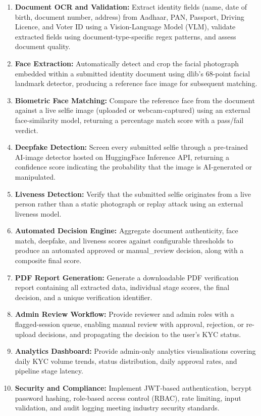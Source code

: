 \documentclass[12pt,a4paper]{report}
\begin{document}
\begin{enumerate}
    \item \textbf{Document OCR and Validation:} Extract identity fields (name, date of birth, document number, address) from Aadhaar, PAN, Passport, Driving Licence, and Voter ID using a Vision-Language Model (VLM), validate extracted fields using document-type-specific regex patterns, and assess document quality.

    \item \textbf{Face Extraction:} Automatically detect and crop the facial photograph embedded within a submitted identity document using dlib's 68-point facial landmark detector, producing a reference face image for subsequent matching.

    \item \textbf{Biometric Face Matching:} Compare the reference face from the document against a live selfie image (uploaded or webcam-captured) using an external face-similarity model, returning a percentage match score with a pass/fail verdict.

    \item \textbf{Deepfake Detection:} Screen every submitted selfie through a pre-trained AI-image detector hosted on HuggingFace Inference API, returning a confidence score indicating the probability that the image is AI-generated or manipulated.

    \item \textbf{Liveness Detection:} Verify that the submitted selfie originates from a live person rather than a static photograph or replay attack using an external liveness model.

    \item \textbf{Automated Decision Engine:} Aggregate document authenticity, face match, deepfake, and liveness scores against configurable thresholds to produce an automated approved or manual\_review decision, along with a composite final score.

    \item \textbf{PDF Report Generation:} Generate a downloadable PDF verification report containing all extracted data, individual stage scores, the final decision, and a unique verification identifier.

    \item \textbf{Admin Review Workflow:} Provide reviewer and admin roles with a flagged-session queue, enabling manual review with approval, rejection, or re-upload decisions, and propagating the decision to the user's KYC status.

    \item \textbf{Analytics Dashboard:} Provide admin-only analytics visualisations covering daily KYC volume trends, status distribution, daily approval rates, and pipeline stage latency.

    \item \textbf{Security and Compliance:} Implement JWT-based authentication, bcrypt password hashing, role-based access control (RBAC), rate limiting, input validation, and audit logging meeting industry security standards.
\end{enumerate}
\end{document}
